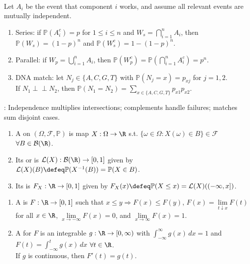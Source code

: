 \begin{example} \label{ex:reliability-and-match-probabilities} \\
Let $A_i$ be the event that component $i$ works, and assume all relevant events are mutually independent.
\begin{enumerate}[label=(\roman*)]
\setlength{\itemsep}{0pt}
\item Series: if $\mathbb{P}(A_i^c)=p$ for $1\leq i\leq n$ and $W_s=\bigcap\limits_{i=1}^{n}A_i$, then $\mathbb{P}(W_s)=(1-p)^n$ and $\mathbb{P}(W_s^c)=1-(1-p)^n$.
\item Parallel: if $W_p=\bigcup\limits_{i=1}^{n}A_i$, then $\mathbb{P}(W_p^c)=\mathbb{P}(\bigcap\limits_{i=1}^{n}A_i^c)=p^n$.
\item DNA match: let $N_j\in\{A,C,G,T\}$ with $\mathbb{P}(N_j=x)=p_{xj}$ for $j=1,2$.\\
If $N_1\perp\!\!\!\perp N_2$, then $\mathbb{P}(N_1=N_2)=\sum\limits_{x\in\{A,C,G,T\}}p_{x1}p_{x2}$.
\end{enumerate}
: Independence multiplies intersections; complements handle failures; matches sum disjoint cases.
\end{example}

\begin{definition} \label{def:random-variable-law-and-cdf} 
\begin{enumerate}[label=(\roman*)]
\setlength{\itemsep}{0pt}
\item A  on $(\Omega,\mathcal{F},\mathbb{P})$ is map $X:\Omega\to\R$ s.t. $\{\omega\in\Omega:X(\omega)\in B\}\in\mathcal{F}$ $\forall B\in\mathcal{B}(\R)$.
\item Its  or  is $\mathcal{L}(X):\mathcal{B}(\R)\to[0,1]$ given by $\mathcal{L}(X)(B)\defeq\mathbb{P}(X^{-1}(B))=\mathbb{P}(X\in B)$.
\item Its  is $F_X:\R\to[0,1]$ given by $F_X(x)\defeq\mathbb{P}(X\leq x)=\mathcal{L}(X)((-\infty,x])$.
\end{enumerate}
\end{definition}

\begin{definition} \label{def:distribution-function-and-density} 
\begin{enumerate}[label=(\roman*)]
\setlength{\itemsep}{0pt}
\item A  is $F:\R\to[0,1]$ such that $x\leq y\Rightarrow F(x)\leq F(y)$, $F(x)=\lim\limits_{t\downarrow x}F(t)$ for all $x\in\R$, $\lim\limits_{x\to-\infty}F(x)=0$, and $\lim\limits_{x\to\infty}F(x)=1$.
\item A  for $F$ is an integrable $g:\R\to[0,\infty)$ with $\int_{-\infty}^{\infty}g(x)\,dx=1$ and $F(t)=\int_{-\infty}^{t}g(x)\,dx$ $\forall t\in\R$.\\
If $g$ is continuous, then $F'(t)=g(t)$.
\end{enumerate}
\end{definition}

